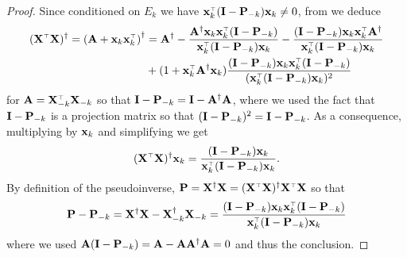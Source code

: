 \documentclass[thesis.tex]{subfiles}
\begin{document}
\begin{proof}
Since conditioned on $E_k$ we have $\x_k^\top (\I - \P_{-k}) \x_k \neq 0$, from \cite[Theorem 1]{10.2307/2099767} we deduce
\begin{align*}
  (\X^\top \X)^\dag = \left( \A + \x_k \x_k^\top \right)^\dagger
  &= \A^\dag
  - \frac{\A^\dag \x_k \x_k^\top (\I - \P_{-k}) }{\x_k^\top ( \I - \P_{-k}) \x_k}
  - \frac{( \I -\P_{-k}) \x_k \x_k^\top \A^\dag}{\x_k^\top ( \I - \P_{-k}) \x_k} \\ 
  &+ (1 + \x_k^\top \A^\dag \x_k) \frac{(\I - \P_{-k}) \x_k \x_k^\top (\I - \P_{-k})}{(\x_k^\top (\I - \P_{-k}) \x_k)^2}
\end{align*}
for $\A = \X_{-k}^\top \X_{-k}$ so that $\mathbf I - \mathbf P_{-k} = \mathbf I - \mathbf A^\dagger \mathbf A$, where we used the fact that $\mathbf I - \mathbf P_{-k}$ is a projection matrix so that $(\mathbf I - \mathbf P_{-k})^2 = \mathbf I - \mathbf P_{-k}$. As a consequence, multiplying by $\mathbf x_k$ and simplifying we get
\[
  (\X^\top \X)^\dag \x_k = \frac{ ( \I -\P_{-k}) \x_k}{\x_k^\top (\I - \P_{-k}) \x_k}.
\]
By definition of the pseudoinverse, $\P = \X^\dagger \X = (\X^\top \X)^\dagger \X^\top \X$ so that 
\[
  \P - \P_{-k} = \X^\dagger \X - \X_{-k}^\dagger \X_{-k} = \frac{( \I - \P_{-k}) \x_k \x_k^\top ( \I - \P_{-k})}{\x_k^\top ( \I - \P_{-k}) \x_k}
\]
where we used $\mathbf A (\mathbf I - \mathbf P_{-k}) = \mathbf A - \mathbf A \mathbf A^\dagger \mathbf A = 0$ and thus the conclusion.
\end{proof}

\end{document}
